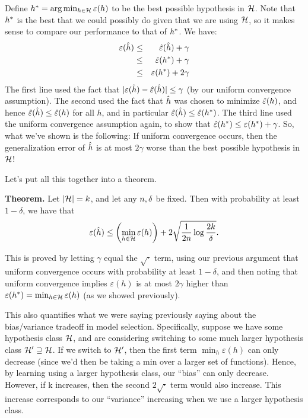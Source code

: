 \documentclass{article} %
\begin{document}
Define $h^\ast = \arg \min_{h \in {\cal H}} \varepsilon(h)$ to be the best possible hypothesis in ${\cal H}$.
Note that $h^\ast$ is the best that we could possibly do given that we are using ${\cal H}$, so it
makes sense to compare our performance to that of $h^\ast$. We have:
\begin{eqnarray*}
\varepsilon(\hat{h}) &\leq& \hat\varepsilon(\hat{h}) + \gamma  \\
&\leq& \hat\varepsilon(h^\ast) + \gamma  \\
&\leq& \varepsilon(h^\ast) + 2\gamma
\end{eqnarray*}
The first line used the fact that $|\varepsilon(\hat{h}) -\hat\varepsilon(\hat{h})| \leq \gamma$ (by our uniform
convergence assumption). The second used the fact that $\hat{h}$ was chosen to minimize $\hat\varepsilon(h)$,
and hence $\hat\varepsilon(\hat{h}) \leq \hat\varepsilon(h)$ for all $h$, and in particular
$\hat\varepsilon(\hat{h}) \leq \hat\varepsilon(h^\ast)$.  The third line used the uniform convergence assumption again,
to show that $\hat\varepsilon(h^\ast) \leq \varepsilon(h^\ast) + \gamma$.  So, what
we've shown is the following: If uniform convergence occurs,
then the generalization error of $\hat{h}$ is at
most $2\gamma$ worse than the best possible hypothesis in ${\cal H}$!

Let's put all this together into a theorem.

\medskip
\noindent
{\bf Theorem.}  Let $|{\cal H}| = k$, and let any ${n}, \delta$ be fixed.  Then with probability
at least $1-\delta$, we have that
\[
\varepsilon(\hat{h}) \leq \left( \min_{h \in {\cal H}} \varepsilon(h) \right) + 2 \sqrt{\frac{1}{2{n}}\log\frac{2k}{\delta}}.
\]
\medskip

This is proved by letting $\gamma$ equal the $\sqrt{\cdot}$ term, using our previous argument
that uniform convergence occurs with probability at least $1-\delta$, and
then noting that uniform convergence implies $\varepsilon(h)$ is at
most $2\gamma$ higher than $\varepsilon(h^\ast) = \min_{h \in {\cal H}} \varepsilon(h)$
(as we showed previously).

This also quantifies what we were saying previously saying about the bias/variance tradeoff in model
selection.  Specifically, suppose we have some hypothesis class ${\cal H}$, and are
considering switching to some much larger hypothesis class ${\cal H}' \supseteq {\cal H}$.
If we switch to ${\cal H}'$, then the first term
$\min_h \varepsilon(h)$ can only decrease (since we'd then be taking a min
over a larger set of functions).  Hence,
by learning using a larger hypothesis class, our ``bias'' can only
decrease.  However, if k increases, then the second $2\sqrt{\cdot}$ term
would also increase.  This increase corresponds to our ``variance'' increasing
when we use a larger hypothesis class.
\end{document}
